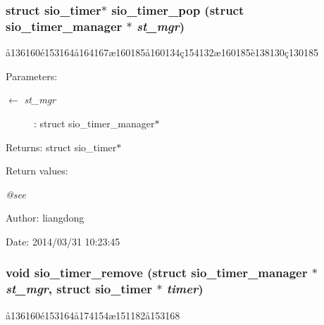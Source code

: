 \subsubsection{\setlength{\rightskip}{0pt plus 5cm}struct sio\_\-timer$\ast$ sio\_\-timer\_\-pop (struct sio\_\-timer\_\-manager $\ast$ {\em st\_\-mgr})}\label{sio__timer_8h_a8}


\aa{}136160\'{e}153164\aa{}164167\ae{}160185\aa{}160134\c{c}154132\ae{}160185\`{e}138130\c{c}130185 

\begin{Desc}
\item[Parameters:]
\begin{description}
\item[\mbox{$\leftarrow$} {\em st\_\-mgr}]: struct sio\_\-timer\_\-manager$\ast$ \end{description}
\end{Desc}
\begin{Desc}
\item[Returns:]struct sio\_\-timer$\ast$ \end{Desc}
\begin{Desc}
\item[Return values:]
\begin{description}
\item[{\em @see}]\end{description}
\end{Desc}
\begin{Desc}
\item[Author:]liangdong \end{Desc}
\begin{Desc}
\item[Date:]2014/03/31 10:23:45 \end{Desc}
\subsubsection{\setlength{\rightskip}{0pt plus 5cm}void sio\_\-timer\_\-remove (struct sio\_\-timer\_\-manager $\ast$ {\em st\_\-mgr}, struct sio\_\-timer $\ast$ {\em timer})}\label{sio__timer_8h_a5}


\aa{}136160\'{e}153164\aa{}174154\ae{}151182\aa{}153168 

